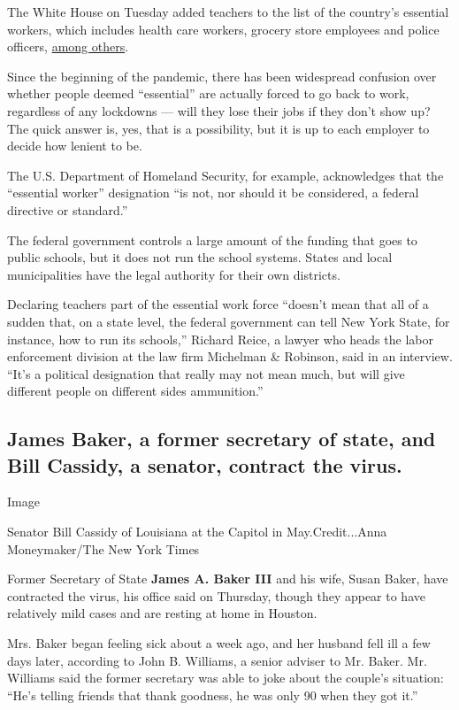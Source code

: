 The White House on Tuesday added teachers to the list of the country's
essential workers, which includes health care workers, grocery store
employees and police officers,
\href{https://covid19.ca.gov/essential-workforce/}{among others}.

Since the beginning of the pandemic, there has been widespread confusion
over whether people deemed ``essential'' are actually forced to go back
to work, regardless of any lockdowns --- will they lose their jobs if
they don't show up? The quick answer is, yes, that is a possibility, but
it is up to each employer to decide how lenient to be.

The U.S. Department of Homeland Security, for example, acknowledges that
the ``essential worker'' designation ``is not, nor should it be
considered, a federal directive or standard.''

The federal government controls a large amount of the funding that goes
to public schools, but it does not run the school systems. States and
local municipalities have the legal authority for their own districts.

Declaring teachers part of the essential work force ``doesn't mean that
all of a sudden that, on a state level, the federal government can tell
New York State, for instance, how to run its schools,'' Richard Reice, a
lawyer who heads the labor enforcement division at the law firm
Michelman \& Robinson, said in an interview. ``It's a political
designation that really may not mean much, but will give different
people on different sides ammunition.''

\hypertarget{james-baker-a-former-secretary-of-state-and-bill-cassidy-a-senator-contract-the-virus}{%
\subsection{James Baker, a former secretary of state, and Bill Cassidy,
a senator, contract the
virus.}\label{james-baker-a-former-secretary-of-state-and-bill-cassidy-a-senator-contract-the-virus}}

Image

Senator Bill Cassidy of Louisiana at the Capitol in May.Credit...Anna
Moneymaker/The New York Times

Former Secretary of State \textbf{James A. Baker III} and his wife,
Susan Baker, have contracted the virus, his office said on Thursday,
though they appear to have relatively mild cases and are resting at home
in Houston.

Mrs. Baker began feeling sick about a week ago, and her husband fell ill
a few days later, according to John B. Williams, a senior adviser to Mr.
Baker. Mr. Williams said the former secretary was able to joke about the
couple's situation: ``He's telling friends that thank goodness, he was
only 90 when they got it.''

